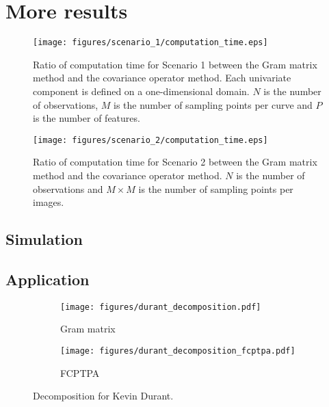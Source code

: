 \section{More results} %
\label{sec:more_results}

\begin{figure}
     \centering
    \texttt{[image: figures/scenario\_1/computation\_time.eps]}
    \caption{Ratio of computation time for Scenario 1 between the Gram matrix method and the covariance operator method. Each univariate component is defined on a one-dimensional domain. $N$ is the number of observations, $M$ is the number of sampling points per curve and $P$ is the number of features.}
    \label{fig:computation_time_mfd_1d}
\end{figure}

\begin{figure}
     \centering
    \texttt{[image: figures/scenario\_2/computation\_time.eps]}
    \caption{Ratio of computation time for Scenario 2 between the Gram matrix method and the covariance operator method. $N$ is the number of observations and $M \times M$ is the number of sampling points per images.}
    \label{fig:computation_time_mfd_2d}
\end{figure}

\subsection{Simulation} %
\label{sub:simulation}


\subsection{Application} %
\label{sub:application}

\begin{figure}
    \centering
    \begin{subfigure}[b]{0.45\textwidth}
        \centering
        \texttt{[image: figures/durant\_decomposition.pdf]}
        \caption{Gram matrix}
        \label{fig:durant_decomposition}
    \end{subfigure}
    \hfill
    \begin{subfigure}[b]{0.45\textwidth}
        \centering
        \texttt{[image: figures/durant\_decomposition\_fcptpa.pdf]}
        \caption{FCPTPA}
        \label{fig:durant_decomposition_fcptpa}
    \end{subfigure}
    \caption{Decomposition for Kevin Durant.}
    \label{fig:durant_shoots_decomposition}
\end{figure}


